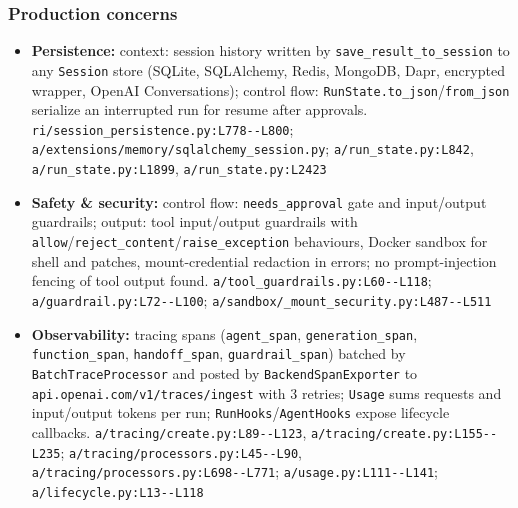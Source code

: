 \subsubsection*{Production concerns}
\begin{itemize}
\item \textbf{Persistence:} context: session history written by \texttt{save\_\allowbreak{}result\_\allowbreak{}to\_\allowbreak{}session} to any \texttt{Session} store (SQLite, SQLAlchemy, Redis, MongoDB, Dapr, encrypted wrapper, OpenAI Conversations); control flow: \texttt{RunState.\allowbreak{}to\_\allowbreak{}json}/\texttt{from\_\allowbreak{}json} serialize an interrupted run for resume after approvals. \texttt{ri/\allowbreak{}session\_\allowbreak{}persistence.\allowbreak{}py:\allowbreak{}L778-\allowbreak{}-\allowbreak{}L800}; \texttt{a/\allowbreak{}extensions/\allowbreak{}memory/\allowbreak{}sqlalchemy\_\allowbreak{}session.\allowbreak{}py}; \texttt{a/\allowbreak{}run\_\allowbreak{}state.\allowbreak{}py:\allowbreak{}L842}, \texttt{a/\allowbreak{}run\_\allowbreak{}state.\allowbreak{}py:\allowbreak{}L1899}, \texttt{a/\allowbreak{}run\_\allowbreak{}state.\allowbreak{}py:\allowbreak{}L2423}
\item \textbf{Safety \& security:} control flow: \texttt{needs\_\allowbreak{}approval} gate and input/output guardrails; output: tool input/output guardrails with \texttt{allow}/\texttt{reject\_\allowbreak{}content}/\texttt{raise\_\allowbreak{}exception} behaviours, Docker sandbox for shell and patches, mount-credential redaction in errors; no prompt-injection fencing of tool output found. \texttt{a/\allowbreak{}tool\_\allowbreak{}guardrails.\allowbreak{}py:\allowbreak{}L60-\allowbreak{}-\allowbreak{}L118}; \texttt{a/\allowbreak{}guardrail.\allowbreak{}py:\allowbreak{}L72-\allowbreak{}-\allowbreak{}L100}; \texttt{a/\allowbreak{}sandbox/\allowbreak{}\_\allowbreak{}mount\_\allowbreak{}security.\allowbreak{}py:\allowbreak{}L487-\allowbreak{}-\allowbreak{}L511}
\item \textbf{Observability:} tracing spans (\texttt{agent\_\allowbreak{}span}, \texttt{generation\_\allowbreak{}span}, \texttt{function\_\allowbreak{}span}, \texttt{handoff\_\allowbreak{}span}, \texttt{guardrail\_\allowbreak{}span}) batched by \texttt{BatchTraceProcessor} and posted by \texttt{BackendSpanExporter} to \texttt{api.\allowbreak{}openai.\allowbreak{}com/\allowbreak{}v1/\allowbreak{}traces/\allowbreak{}ingest} with 3 retries; \texttt{Usage} sums requests and input/output tokens per run; \texttt{RunHooks}/\texttt{AgentHooks} expose lifecycle callbacks. \texttt{a/\allowbreak{}tracing/\allowbreak{}create.\allowbreak{}py:\allowbreak{}L89-\allowbreak{}-\allowbreak{}L123}, \texttt{a/\allowbreak{}tracing/\allowbreak{}create.\allowbreak{}py:\allowbreak{}L155-\allowbreak{}-\allowbreak{}L235}; \texttt{a/\allowbreak{}tracing/\allowbreak{}processors.\allowbreak{}py:\allowbreak{}L45-\allowbreak{}-\allowbreak{}L90}, \texttt{a/\allowbreak{}tracing/\allowbreak{}processors.\allowbreak{}py:\allowbreak{}L698-\allowbreak{}-\allowbreak{}L771}; \texttt{a/\allowbreak{}usage.\allowbreak{}py:\allowbreak{}L111-\allowbreak{}-\allowbreak{}L141}; \texttt{a/\allowbreak{}lifecycle.\allowbreak{}py:\allowbreak{}L13-\allowbreak{}-\allowbreak{}L118}

\end{itemize}
